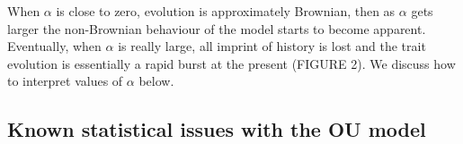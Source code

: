 \documentclass[a4paper,12pt]{article}
\begin{document}
    When $\alpha$ is close to zero, evolution is approximately Brownian, then as $\alpha$ gets larger the non-Brownian behaviour of the model starts to become apparent. 
    Eventually, when $\alpha$ is really large, all imprint of history is lost and the trait evolution is essentially a rapid burst at the present (FIGURE 2). %
    We discuss how to interpret values of $\alpha$ below.
  
  \subsection{Known statistical issues with the OU model}

\end{document}
